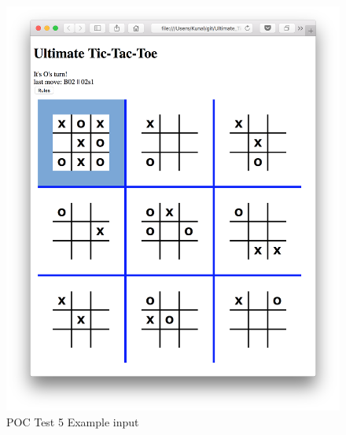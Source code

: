 \documentclass[12pt, titlepage]{article}
\begin{document}
\begin{figure}
  \includegraphics[width=\linewidth]{Figures/Test5-input.png}
  \caption{POC Test 5 Example input}
  \label{fig:Test5_input}
\end{figure}
\end{document}
